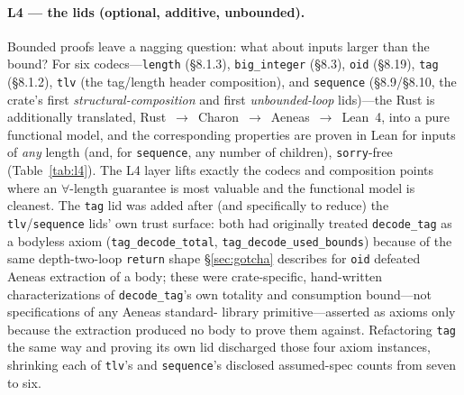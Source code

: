 \documentclass[10pt,twocolumn]{article}
\newcommand{\code}[1]{\texttt{\small #1}}
\begin{document}
\paragraph{L4 --- the lids (optional, additive, unbounded).}
Bounded proofs leave a nagging question: what about inputs larger than the
bound? For six codecs---\code{length} (\S8.1.3), \code{big\_integer}
(\S8.3), \code{oid} (\S8.19), \code{tag} (\S8.1.2), \code{tlv} (the
tag/length header composition), and \code{sequence} (\S8.9/\S8.10, the
crate's first \emph{structural-composition} and first \emph{unbounded-loop}
lids)---the Rust is additionally translated,
Rust~$\to$~Charon~$\to$~Aeneas~$\to$~Lean~4, into a pure functional model, and
the corresponding properties are proven in Lean for inputs of \emph{any}
length (and, for \code{sequence}, any number of children), \code{sorry}-free
(Table~\ref{tab:l4}). The L4 layer lifts exactly the
codecs and composition points where an $\forall$-length guarantee is most
valuable and the functional model is cleanest. The \code{tag} lid was added
after (and specifically to reduce) the \code{tlv}/\code{sequence} lids'
own trust surface: both had originally treated \code{decode\_tag} as a
bodyless axiom (\code{tag\_decode\_total}, \code{tag\_decode\_used\_bounds})
because of the same depth-two-loop \code{return} shape \S\ref{sec:gotcha}
describes for \code{oid} defeated Aeneas extraction of a body; these were
crate-specific, hand-written characterizations of \code{decode\_tag}'s own
totality and consumption bound---not specifications of any Aeneas standard-
library primitive---asserted as axioms only because the extraction produced no
body to prove them against. Refactoring \code{tag} the same way and proving
its own lid discharged those four axiom instances, shrinking each of
\code{tlv}'s and \code{sequence}'s disclosed assumed-spec counts from seven to
six.
\end{document}
